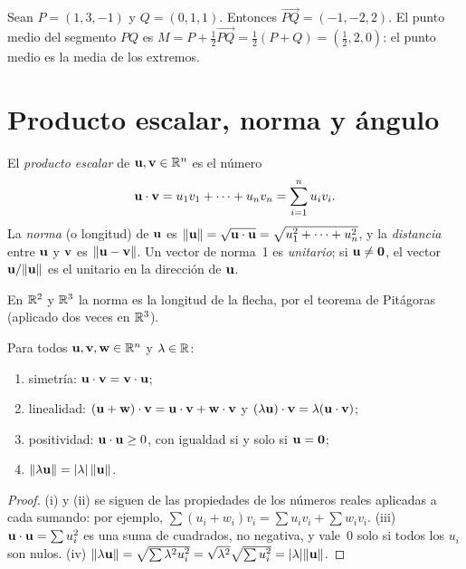 \begin{ejemplo}\label{ej:t1-punto-medio}
Sean $P=(1,3,-1)$ y $Q=(0,1,1)$. Entonces $\overrightarrow{PQ}=(-1,-2,2)$. El punto medio del segmento $PQ$ es $M=P+\tfrac12\overrightarrow{PQ}=\tfrac12(P+Q)=(\tfrac12,2,0)$: el punto medio es la media de los extremos.
\end{ejemplo}

\section{Producto escalar, norma y ángulo}

\begin{definicion}\label{def:escalar}
El \emph{producto escalar} de $\mathbf{u},\mathbf{v}\in\mathbb{R}^n$ es el número
\[
\mathbf{u}\cdot\mathbf{v}=u_1v_1+\dots+u_nv_n=\sum_{i=1}^{n}u_iv_i .
\]
La \emph{norma} (o longitud) de $\mathbf{u}$ es $\lVert\mathbf{u}\rVert=\sqrt{\mathbf{u}\cdot\mathbf{u}}=\sqrt{u_1^2+\dots+u_n^2}$, y la \emph{distancia} entre $\mathbf{u}$ y $\mathbf{v}$ es $\lVert\mathbf{u}-\mathbf{v}\rVert$. Un vector de norma~1 es \emph{unitario}; si $\mathbf{u}\neq\mathbf{0}$, el vector $\mathbf{u}/\lVert\mathbf{u}\rVert$ es el unitario en la dirección de $\mathbf{u}$.
\end{definicion}

En $\mathbb{R}^2$ y $\mathbb{R}^3$ la norma es la longitud de la flecha, por el teorema de Pitágoras (aplicado dos veces en $\mathbb{R}^3$).

\begin{proposicion}\label{prop:escalar}
Para todos $\mathbf{u},\mathbf{v},\mathbf{w}\in\mathbb{R}^n$ y $\lambda\in\mathbb{R}$:
\begin{enumerate}
  \item simetría: $\mathbf{u}\cdot\mathbf{v}=\mathbf{v}\cdot\mathbf{u}$;
  \item linealidad: $(\mathbf{u}+\mathbf{w})\cdot\mathbf{v}=\mathbf{u}\cdot\mathbf{v}+\mathbf{w}\cdot\mathbf{v}$ y $(\lambda\mathbf{u})\cdot\mathbf{v}=\lambda(\mathbf{u}\cdot\mathbf{v})$;
  \item positividad: $\mathbf{u}\cdot\mathbf{u}\ge 0$, con igualdad si y solo si $\mathbf{u}=\mathbf{0}$;
  \item $\lVert\lambda\mathbf{u}\rVert=\lvert\lambda\rvert\,\lVert\mathbf{u}\rVert$.
\end{enumerate}
\end{proposicion}

\begin{proof}
(i) y (ii) se siguen de las propiedades de los números reales aplicadas a cada sumando: por ejemplo, $\sum(u_i+w_i)v_i=\sum u_iv_i+\sum w_iv_i$. (iii) $\mathbf{u}\cdot\mathbf{u}=\sum u_i^2$ es una suma de cuadrados, no negativa, y vale~0 solo si todos los $u_i$ son nulos. (iv) $\lVert\lambda\mathbf{u}\rVert=\sqrt{\sum\lambda^2u_i^2}=\sqrt{\lambda^2}\sqrt{\sum u_i^2}=\lvert\lambda\rvert\lVert\mathbf{u}\rVert$.
\end{proof}

